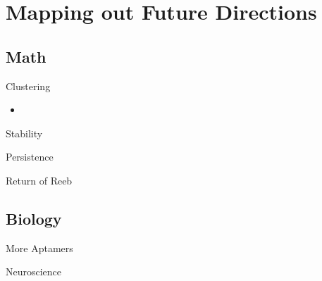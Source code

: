 \documentclass{beamer}
\begin{document}
\section{Mapping out Future Directions}
\subsection{Math}
\begin{frame}{Clustering}
  \begin{itemize}
    \item 
  \end{itemize}
\end{frame}

\begin{frame}{Stability}
  
\end{frame}

\begin{frame}{Persistence}
  
\end{frame}

\begin{frame}{Return of Reeb}
  
\end{frame}

\subsection{Biology}
\begin{frame}{More Aptamers}
  
\end{frame}

\begin{frame}{Neuroscience}

\end{frame}
\end{document}
